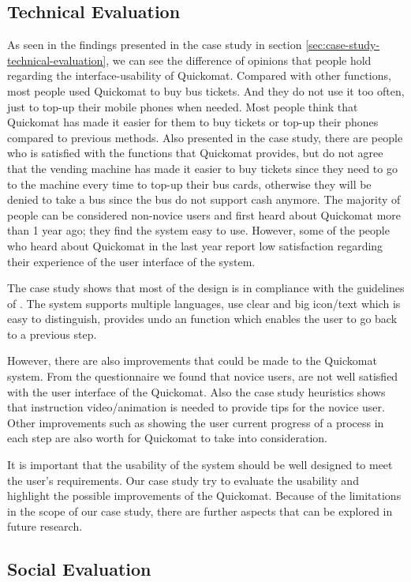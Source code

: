 \documentclass[twocolumn]{article}
\begin{document}
\subsection{Technical Evaluation}
As seen in the findings presented in the case study in section \ref{sec:case-study-technical-evaluation}, we can see the difference of opinions that people hold regarding the interface-usability of Quickomat. Compared with other functions, most people used Quickomat to buy bus tickets. And they do not use it too often, just to top-up their mobile phones when needed. Most people think that Quickomat has made it easier for them to buy tickets or top-up their phones compared to previous methods. Also presented in the case study, there are people who is satisfied with the functions that Quickomat provides, but do not agree that the vending machine has made it easier to buy tickets since they need to go to the machine every time to top-up their bus cards, otherwise they will be denied to take a bus since the bus do not support cash anymore. The majority of people can be considered non-novice users and first heard about Quickomat more than 1 year ago; they find the system easy to use. However, some of the people who heard about Quickomat in the last year report low satisfaction regarding their experience of the user interface of the system.

The case study shows that most of the design is in compliance with the guidelines of \citet{Nielsen1994}. The system supports multiple languages, use clear and big icon/text which is easy to distinguish, provides undo an function which enables the user to go back to a previous step.

However, there are also improvements that could be made to the Quickomat system. From the questionnaire we found that novice users, are not well satisfied with the user interface of the Quickomat. Also the case study heuristics shows that instruction video/animation is needed to provide tips for the novice user. Other improvements such as showing the user current progress of a process in each step are also worth for Quickomat to take into consideration.

It is important that the usability of the system should be well designed to meet the user’s requirements. Our case study try to evaluate the usability and highlight the possible improvements of the Quickomat. Because of the limitations in the scope of our case study, there are further aspects that can be explored in future research.

\subsection{Social Evaluation}
\end{document}
